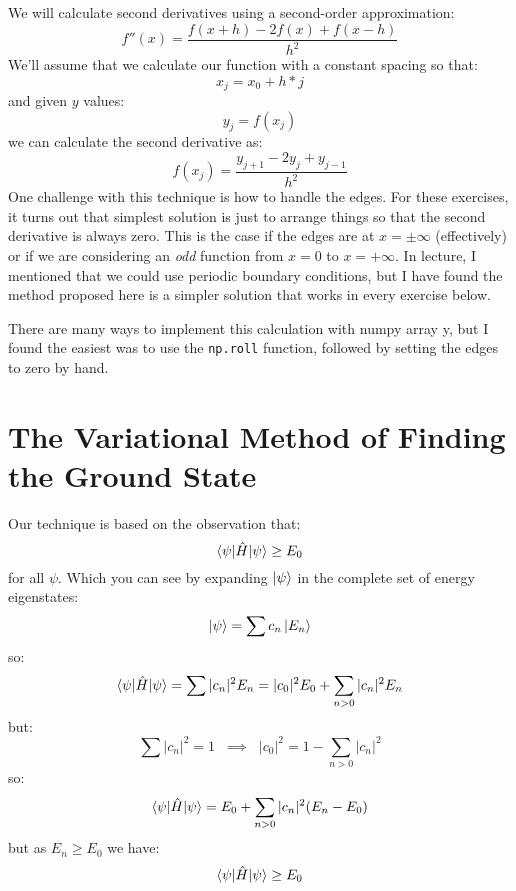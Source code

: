 \documentclass[12pt]{article}
\begin{document}
We will calculate second derivatives using a second-order approximation:
$$f''(x) = \frac{f(x+h)-2f(x)+f(x-h)}{h^2}$$
We'll assume that we calculate our function with a constant spacing so that:
$$x_j = x_0 + h * j$$
and given $y$ values:
$$y_j = f(x_j)$$
we can calculate the second derivative as:
$$f(x_j) = \frac{y_{j + 1} - 2 y_j + y_{j-1}}{h^2}$$
One challenge with this technique is how to handle the edges.  For these exercises, it turns out that simplest solution is just to arrange things so that the second derivative is always zero.  This is the case if the edges are at $x=\pm\infty$ (effectively) or if we are considering an {\em odd} function from $x=0$ to $x=+\infty$.  In lecture, I mentioned that we could use periodic boundary conditions, but I have found the method proposed here is a simpler solution that works in every exercise below.

There are many ways to implement this calculation with numpy array y, but I found the easiest was to use the {\tt np.roll} function, followed by setting the edges to zero by hand.

\section{The Variational Method of Finding the Ground State}

Our technique is based on the observation that:
$$\braket{\psi|\hat{H}|\psi} \geq E_0$$
for all $\psi$.  Which you can see by expanding $\ket{\psi}$ in the complete set of energy eigenstates:
$$\ket{\psi} = \sum c_n \ket{E_n}$$
so:
$$\braket{\psi|\hat{H}|\psi} = \sum |c_n|^2 E_n = |c_0|^2 E_0 + \sum_{n>0} |c_n|^2 E_n$$
but:
$$\sum |c_n|^2 = 1 \;\; \implies \;\; |c_0|^2 = 1 - \sum_{n>0} |c_n|^2$$
so:
$$\braket{\psi|\hat{H}|\psi} = E_0 + \sum_{n>0} |c_n|^2 (E_n - E_0)$$
but as $E_n \geq E_0$ we have:
$$\braket{\psi|\hat{H}|\psi} \geq E_0$$
\end{document}
